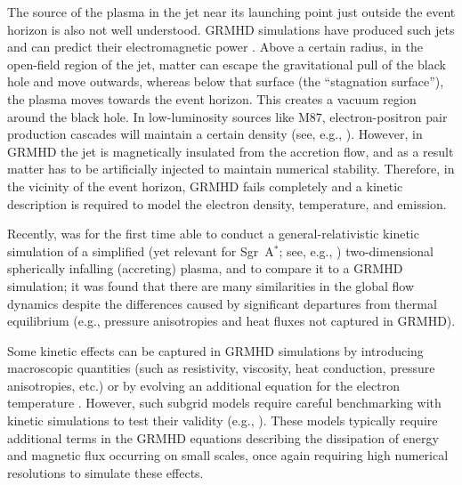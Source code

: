 \documentclass[graybox,envcountchap]{svmult}
\begin{document}
The source of the plasma in the jet near its launching point just outside the event horizon is also not well understood.
GRMHD simulations have produced such jets and can predict their electromagnetic power \cite{Porth2019}.
Above a certain radius, in the open-field region of the jet, matter can escape the gravitational pull of the black hole and move outwards, whereas below that surface (the ``stagnation surface''), the plasma moves towards the event horizon.
This creates a vacuum region around the black hole.
In low-luminosity sources like M87, electron-positron pair production cascades will maintain a certain density (see, e.g., \cite{Levinson2018,Crinquand2020,Chen2020}).
However, in GRMHD the jet is magnetically insulated from the accretion flow, and as a result matter has to be artificially injected to maintain numerical stability.
Therefore, in the vicinity of the event horizon, GRMHD fails completely and a kinetic description is required to model the electron density, temperature, and emission.

Recently, \cite{Galishnikova2023a} was for the first time able to conduct a general-relativistic kinetic simulation of a simplified (yet relevant for Sgr~A$^*$; see, e.g., \cite{Ressler2020}) two-dimensional spherically infalling (accreting) plasma, and to compare it to a GRMHD simulation; it was found that there are many similarities in the global flow dynamics despite the differences caused by significant departures from thermal equilibrium (e.g., pressure anisotropies and heat fluxes not captured in GRMHD).

Some kinetic effects can be captured in GRMHD simulations by introducing macroscopic quantities (such as resistivity, viscosity, heat conduction, pressure anisotropies, etc.) or by evolving an additional equation for the electron temperature \cite{Bugli2014,Ressler2015,Chandra2015,Foucart2016,Chael2017,Chandra2017,Foucart2017,Qian2018,Ripperda2019,Vourellis2019,Ripperda2020,Most2021,Nathanail2022,Most2022,Vos2023}.
However, such subgrid models require careful benchmarking with kinetic simulations to test their validity (e.g., \cite{Bransgrove2021}).
These models typically require additional terms in the GRMHD equations describing the dissipation of energy and magnetic flux occurring on small scales, once again requiring high numerical resolutions to simulate these effects. 

\bigskip
\end{document}
